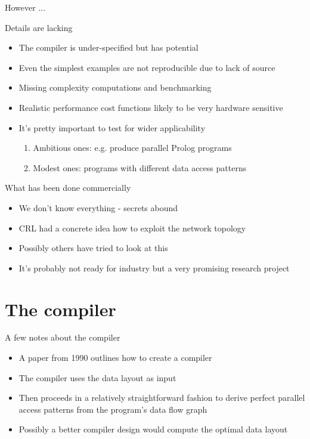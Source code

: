 \documentclass{beamer}
\begin{document}
\begin{frame}{However ...}
\begin{block}{Details are lacking}
\begin{itemize}
\item The compiler is under-specified but has potential
\item Even the simplest examples are not reproducible due to lack of source
\item Missing complexity computations and benchmarking
\item Realistic performance cost functions likely to be very hardware sensitive
\item It's pretty important to test for wider applicability
\begin{enumerate}
\item Ambitious ones: e.g. produce parallel Prolog programs
\item Modest ones: programs with different data access patterns
\end{enumerate}
\end{itemize}
\end{block}
\end{frame}

\begin{frame}{What has been done commercially}
\begin{itemize}
\item We don't know everything - secrets abound
\item CRL had a concrete idea how to exploit the network topology
\item Possibly others have tried to look at this
\item It's probably not ready for industry but a very promising research project
\end{itemize}
\end{frame}



\section{The compiler}
\begin{frame}{A few notes about the compiler}
\begin{itemize}
\item A paper from 1990 outlines how to create a compiler
\item The compiler uses the data layout as input
\item Then proceeds in a relatively straightforward fashion to derive perfect parallel access patterns from the program's data flow graph
\item Possibly a better compiler design would compute the optimal data layout
\end{itemize}
\end{frame}
\end{document}
